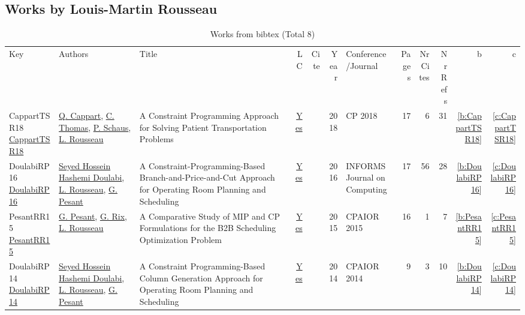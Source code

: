 \subsection{Works by Louis{-}Martin Rousseau}
\label{sec:a332}
{\scriptsize
\begin{longtable}{>{\raggedright\arraybackslash}p{3cm}>{\raggedright\arraybackslash}p{6cm}>{\raggedright\arraybackslash}p{6.5cm}rrrp{2.5cm}rrrrr}
\rowcolor{white}\caption{Works from bibtex (Total 8)}\\ \toprule
\rowcolor{white}Key & Authors & Title & LC & Cite & Year & \shortstack{Conference\\/Journal} & Pages & \shortstack{Nr\\Cites} & \shortstack{Nr\\Refs} & b & c \\ \midrule\endhead
\bottomrule
\endfoot
CappartTSR18 \href{https://doi.org/10.1007/978-3-319-98334-9\_32}{CappartTSR18} & \hyperref[auth:a42]{Q. Cappart}, \hyperref[auth:a847]{C. Thomas}, \hyperref[auth:a148]{P. Schaus}, \hyperref[auth:a332]{L. Rousseau} & A Constraint Programming Approach for Solving Patient Transportation Problems & \href{works/CappartTSR18.pdf}{Yes} & \cite{CappartTSR18} & 2018 & CP 2018 & 17 & 6 & 31 & \ref{b:CappartTSR18} & \ref{c:CappartTSR18}\\
DoulabiRP16 \href{https://doi.org/10.1287/ijoc.2015.0686}{DoulabiRP16} & \hyperref[auth:a336]{Seyed Hossein Hashemi Doulabi}, \hyperref[auth:a332]{L. Rousseau}, \hyperref[auth:a8]{G. Pesant} & A Constraint-Programming-Based Branch-and-Price-and-Cut Approach for Operating Room Planning and Scheduling & \href{works/DoulabiRP16.pdf}{Yes} & \cite{DoulabiRP16} & 2016 & INFORMS Journal on Computing & 17 & 56 & 28 & \ref{b:DoulabiRP16} & \ref{c:DoulabiRP16}\\
PesantRR15 \href{https://doi.org/10.1007/978-3-319-18008-3\_21}{PesantRR15} & \hyperref[auth:a8]{G. Pesant}, \hyperref[auth:a331]{G. Rix}, \hyperref[auth:a332]{L. Rousseau} & A Comparative Study of {MIP} and {CP} Formulations for the {B2B} Scheduling Optimization Problem & \href{works/PesantRR15.pdf}{Yes} & \cite{PesantRR15} & 2015 & CPAIOR 2015 & 16 & 1 & 7 & \ref{b:PesantRR15} & \ref{c:PesantRR15}\\
DoulabiRP14 \href{https://doi.org/10.1007/978-3-319-07046-9\_32}{DoulabiRP14} & \hyperref[auth:a336]{Seyed Hossein Hashemi Doulabi}, \hyperref[auth:a332]{L. Rousseau}, \hyperref[auth:a8]{G. Pesant} & A Constraint Programming-Based Column Generation Approach for Operating Room Planning and Scheduling & \href{works/DoulabiRP14.pdf}{Yes} & \cite{DoulabiRP14} & 2014 & CPAIOR 2014 & 9 & 3 & 10 & \ref{b:DoulabiRP14} & \ref{c:DoulabiRP14}\\

\end{longtable}}
